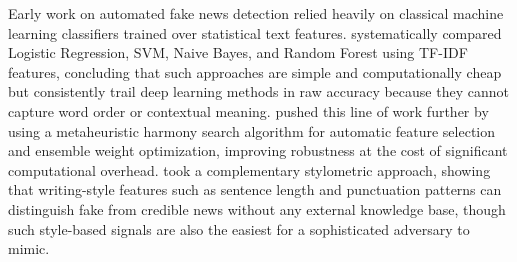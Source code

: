 

Early work on automated fake news detection relied heavily on classical machine learning classifiers trained over statistical text features. \citet{Aphiwongsophon2021Detecting} systematically compared Logistic Regression, SVM, Naive Bayes, and Random Forest using TF-IDF features, concluding that such approaches are simple and computationally cheap but consistently trail deep learning methods in raw accuracy because they cannot capture word order or contextual meaning. \citet{Huang2020FakeNews} pushed this line of work further by using a metaheuristic harmony search algorithm for automatic feature selection and ensemble weight optimization, improving robustness at the cost of significant computational overhead. \citet{Przybyla2020Capturing} took a complementary stylometric approach, showing that writing-style features such as sentence length and punctuation patterns can distinguish fake from credible news without any external knowledge base, though such style-based signals are also the easiest for a sophisticated adversary to mimic.


